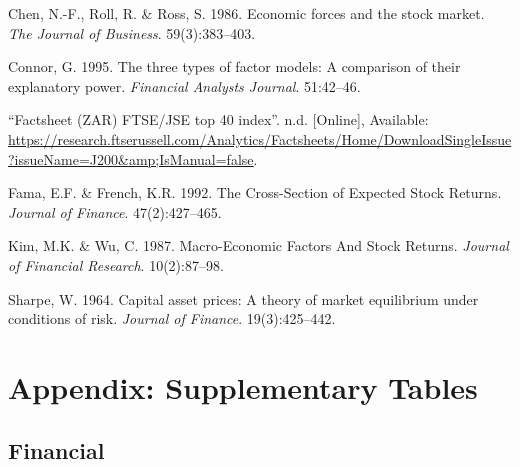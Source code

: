 \documentclass[11pt,preprint, authoryear]{elsarticle}
\numberwithin{equation}{section}
\numberwithin{figure}{section}
\numberwithin{table}{section}
\newlength{\cslhangindent}
\newenvironment{CSLReferences}%
  {\setlength{\parindent}{0pt}%
  \everypar{\setlength{\hangindent}{\cslhangindent}}\ignorespaces}%
  {\par}
\begin{document}
\hypertarget{refs}{}
\begin{CSLReferences}{1}{0}
\leavevmode\hypertarget{ref-Chen1986}{}%
Chen, N.-F., Roll, R. \& Ross, S. 1986. Economic forces and the stock
market. \emph{The Journal of Business}. 59(3):383--403.

\leavevmode\hypertarget{ref-Connor}{}%
Connor, G. 1995. The three types of factor models: A comparison of their
explanatory power. \emph{Financial Analysts Journal}. 51:42--46.

\leavevmode\hypertarget{ref-FTSE}{}%
{``Factsheet (ZAR) FTSE/JSE top 40 index''}. n.d. {[}Online{]},
Available:
\url{https://research.ftserussell.com/Analytics/Factsheets/Home/DownloadSingleIssue?issueName=J200\&amp;IsManual=false}.

\leavevmode\hypertarget{ref-Fama1992}{}%
Fama, E.F. \& French, K.R. 1992. {The Cross-Section of Expected Stock
Returns}. \emph{Journal of Finance}. 47(2):427--465.

\leavevmode\hypertarget{ref-Kim1987}{}%
Kim, M.K. \& Wu, C. 1987. {Macro-Economic Factors And Stock Returns}.
\emph{Journal of Financial Research}. 10(2):87--98.

\leavevmode\hypertarget{ref-Sharpe1964}{}%
Sharpe, W. 1964. Capital asset prices: A theory of market equilibrium
under conditions of risk. \emph{Journal of Finance}. 19(3):425--442.

\end{CSLReferences}

\newpage

\hypertarget{appendix-supplementary-tables}{%
\section{Appendix: Supplementary
Tables}\label{appendix-supplementary-tables}}

\hypertarget{financial}{%
\subsection{Financial}\label{financial}}
\end{document}

